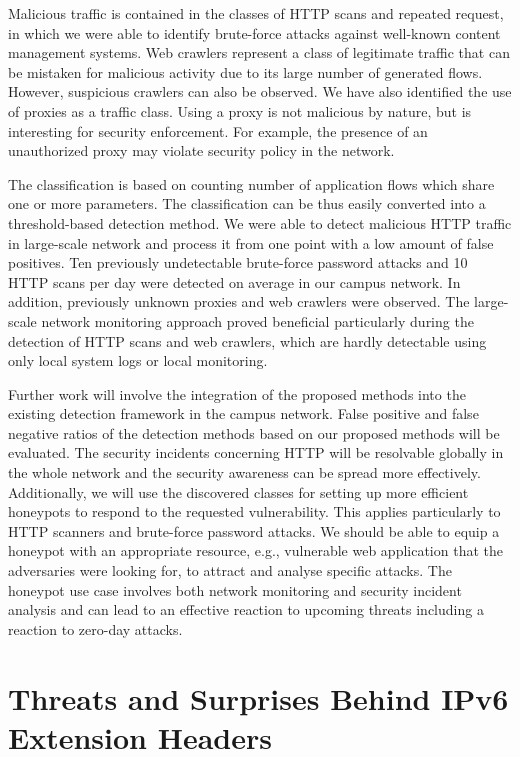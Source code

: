 Malicious traffic is contained in the classes of HTTP scans and repeated request, in which we were able to identify brute-force attacks against well-known content management systems. Web crawlers represent a class of legitimate traffic that can be mistaken for malicious activity due to its large number of generated flows. However, suspicious crawlers can also be observed. We have also identified the use of proxies as a traffic class. Using a proxy is not malicious by nature, but is interesting for security enforcement. For example, the presence of an unauthorized proxy may violate security policy in the network.

The classification is based on counting number of application flows which share one or more parameters. The classification can be thus easily converted into a threshold-based detection method. 
We were able to detect malicious HTTP traffic in large-scale network and process it from one point with a low amount of false positives. Ten previously undetectable brute-force password attacks and 10 HTTP scans per day were detected on average in our campus network. In addition, previously unknown proxies and web crawlers were observed. 
The large-scale network monitoring approach proved beneficial particularly during the detection of HTTP scans and web crawlers, which are hardly detectable using only local system logs or local monitoring.

Further work will involve the integration of the proposed methods into the existing detection framework in the campus network. False positive and false negative ratios of the detection methods based on our proposed methods will be evaluated. The security incidents concerning HTTP will be resolvable globally in the whole network and the security awareness can be spread more effectively. 
Additionally, we will use the discovered classes for setting up more efficient honeypots to respond to the requested vulnerability. This applies particularly to HTTP scanners and brute-force password attacks. We should be able to equip a honeypot with an appropriate resource, e.g., vulnerable web application that the adversaries were looking for, to attract and analyse specific attacks. 
The honeypot use case involves both network monitoring and security incident analysis and can lead to an effective reaction to upcoming threats including a reaction to zero-day attacks.


\section{Threats and Surprises Behind IPv6 Extension Headers}\label{sec:analysis-ipv6-threats}

